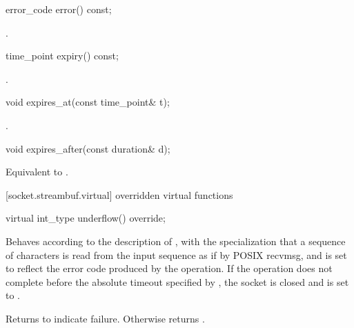 \begin{itemdecl}
error_code error() const;
\end{itemdecl}

\begin{itemdescr}
\pnum
\returns {}.
\end{itemdescr}

\begin{itemdecl}
time_point expiry() const;
\end{itemdecl}

\begin{itemdescr}
\pnum
\returns {}.
\end{itemdescr}

\begin{itemdecl}
void expires_at(const time_point& t);
\end{itemdecl}

\begin{itemdescr}
\pnum
\postconditions {}.
\end{itemdescr}

\begin{itemdecl}
void expires_after(const duration& d);
\end{itemdecl}

\begin{itemdescr}
\pnum
\effects Equivalent to .
\end{itemdescr}



[socket.streambuf.virtual]{ overridden virtual functions}

\begin{itemdecl}
virtual int_type underflow() override;
\end{itemdecl}

\begin{itemdescr}
\pnum
\effects Behaves according to the description of , with the specialization that a sequence of characters is read from the input sequence as if by POSIX recvmsg, and  is set to reflect the error code produced by the operation. If the operation does not complete before the absolute timeout specified by , the socket is closed and  is set to .

\pnum
\effects Returns  to indicate failure. Otherwise returns .
\end{itemdescr}

